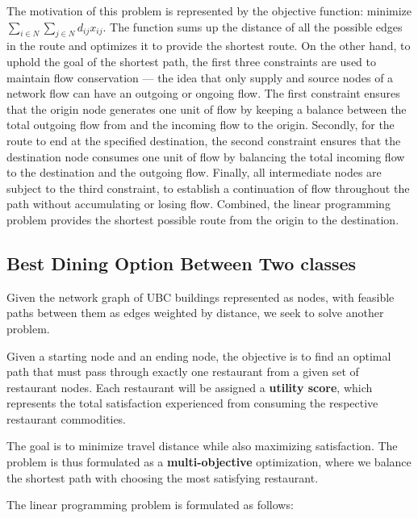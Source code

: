 \documentclass[12pt]{report}
\begin{document}
The motivation of this problem is represented by the objective function: minimize $\sum_{i\in N}\sum_{j\in N}d_{ij}x_{ij}$. The function sums up the distance of all the possible edges in the route and optimizes it to provide the shortest route. On the other hand, to uphold the goal of the shortest path, the first three constraints are used to maintain flow conservation — the idea that only supply and source nodes of a network flow can have an outgoing or ongoing flow. The first constraint ensures that the origin node generates one unit of flow by keeping a balance between the total outgoing flow from and the incoming flow to the origin. Secondly, for the route to end at the specified destination, the second constraint ensures that the destination node consumes one unit of flow by balancing the total incoming flow to the destination and the outgoing flow. Finally, all intermediate nodes are subject to the third constraint, to establish a continuation of flow throughout the path without accumulating or losing flow. Combined, the linear programming problem provides the shortest possible route from the origin to the destination.

 
\subsection{Best Dining Option Between Two classes}

Given the network graph of UBC buildings represented as nodes, with feasible paths between them as edges weighted by distance, we seek to solve another problem.

Given a starting node and an ending node, the objective is to find an optimal path that must pass through exactly one restaurant from a given set of restaurant nodes. Each restaurant will be assigned a \textbf{utility score}, which represents the total satisfaction experienced from consuming the respective restaurant commodities. 

The goal is to minimize travel distance while also maximizing satisfaction. The problem is thus formulated as a \textbf{multi-objective} optimization, where we balance the shortest path with choosing the most satisfying restaurant.

The linear programming problem is formulated as follows:\\
\end{document}
